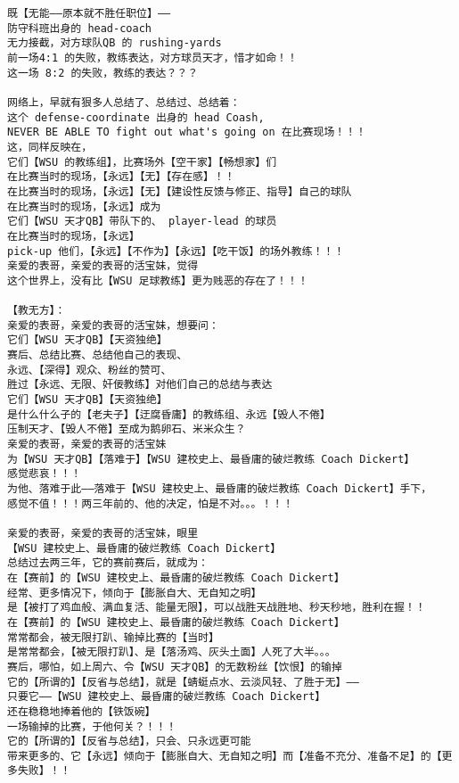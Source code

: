 \documentclass[9pt, b5paper]{article}
\begin{document}
\begin{verbatim}
既【无能——原本就不胜任职位】——
防守科班出身的 head-coach
无力接截，对方球队QB 的 rushing-yards
前一场4:1 的失败，教练表达，对方球员天才，惜才如命！！
这一场 8:2 的失败，教练的表达？？？

网络上，早就有狠多人总结了、总结过、总结着：
这个 defense-coordinate 出身的 head Coash,
NEVER BE ABLE TO fight out what's going on 在比赛现场！！！
这，同样反映在，
它们【WSU 的教练组】，比赛场外【空干家】【畅想家】们
在比赛当时的现场，【永远】【无】【存在感】！！
在比赛当时的现场，【永远】【无】【建设性反馈与修正、指导】自己的球队
在比赛当时的现场，【永远】成为
它们【WSU 天才QB】带队下的、 player-lead 的球员
在比赛当时的现场，【永远】
pick-up 他们，【永远】【不作为】【永远】【吃干饭】的场外教练！！！
亲爱的表哥，亲爱的表哥的活宝妹，觉得
这个世界上，没有比【WSU 足球教练】更为贱恶的存在了！！！

【教无方】：
亲爱的表哥，亲爱的表哥的活宝妹，想要问：
它们【WSU 天才QB】【天资独绝】
赛后、总结比赛、总结他自己的表现、
永远、【深得】观众、粉丝的赞可、
胜过【永远、无限、奸佞教练】对他们自己的总结与表达
它们【WSU 天才QB】【天资独绝】
是什么什么子的【老夫子】【迂腐昏庸】的教练组、永远【毁人不倦】
压制天才、【毁人不倦】至成为鹅卵石、米米众生？
亲爱的表哥，亲爱的表哥的活宝妹
为【WSU 天才QB】【落难于】【WSU 建校史上、最昏庸的破烂教练 Coach Dickert】
感觉悲哀！！！
为他、落难于此——落难于【WSU 建校史上、最昏庸的破烂教练 Coach Dickert】手下，
感觉不值！！！两三年前的、他的决定，怕是不对。。。！！！

亲爱的表哥，亲爱的表哥的活宝妹，眼里
【WSU 建校史上、最昏庸的破烂教练 Coach Dickert】
总结过去两三年，它的赛前赛后，就成为：
在【赛前】的【WSU 建校史上、最昏庸的破烂教练 Coach Dickert】
经常、更多情况下，倾向于【膨胀自大、无自知之明】
是【被打了鸡血般、满血复活、能量无限】，可以战胜天战胜地、秒天秒地，胜利在握！！
在【赛前】的【WSU 建校史上、最昏庸的破烂教练 Coach Dickert】
常常都会，被无限打趴、输掉比赛的【当时】
是常常都会，【被无限打趴】、是【落汤鸡、灰头土面】人死了大半。。。
赛后，哪怕，如上周六、令【WSU 天才QB】的无数粉丝【饮恨】的输掉
它的【所谓的】【反省与总结】，就是【蜻蜓点水、云淡风轻、了胜于无】——
只要它——【WSU 建校史上、最昏庸的破烂教练 Coach Dickert】
还在稳稳地捧着他的【铁饭碗】
一场输掉的比赛，于他何关？！！！
它的【所谓的】【反省与总结】，只会、只永远更可能
带来更多的、它【永远】倾向于【膨胀自大、无自知之明】而【准备不充分、准备不足】的【更多失败】！！


\end{verbatim}
\end{document}
